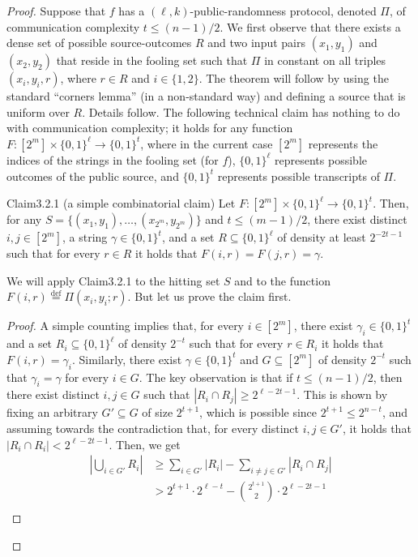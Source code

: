 \begin{proof}
Suppose that $f$ has a $(\ell,k)$-public-randomness protocol, denoted $\Pi$, of communication complexity $t\le(n-1)/2$. We first observe that there exists a dense set of possible source-outcomes $R$ and two input pairs $(x_1,y_1)$ and $(x_2,y_2)$ that reside in the fooling set such that $\Pi$ in constant on all triples $(x_i,y_i,r)$, where $r\in R$ and $i\in\{1,2\}$. The theorem will follow by using the standard ``corners lemma'' (in a non-standard way) and defining a source that is uniform over $R$. Details follow.
The following technical claim has nothing to do with communication complexity; it holds for any function $F:[2^m]\times\{0,1\}^\ell\to\{0,1\}^t$, where in the current case $[2^m]$ represents the indices of the strings in the fooling set (for $f$), $\{0,1\}^\ell$ represents possible outcomes of the public source, and $\{0,1\}^t$ represents possible transcripts of $\Pi$.
\begin{authorclaim}{Claim3.2.1 (a simple combinatorial claim)}
Let $F:[2^m]\times\{0,1\}^\ell\to\{0,1\}^t$. Then, for any $S=\{(x_1,y_1),\ldots,(x_{2^m},y_{2^m})\}$ and $t\le(m-1)/2$, there exist distinct $i,j\in[2^m]$, a string $\gamma\in\{0,1\}^t$, and a set $R\subseteq\{0,1\}^\ell$ of density at least $2^{-2t-1}$ such that for every $r\in R$ it holds that $F(i,r)=F(j,r)=\gamma$.
\end{authorclaim}
We will apply Claim3.2.1 to the hitting set $S$ and to the function $F(i,r)\stackrel{\mathrm{def}}=\Pi(x_i,y_i;r)$. But let us prove the claim first.
\begin{proof}
A simple counting implies that, for every $i\in[2^m]$, there exist $\gamma_i\in\{0,1\}^t$ and a set $R_i\subseteq\{0,1\}^\ell$ of density $2^{-t}$ such that for every $r\in R_i$ it holds that $F(i,r)=\gamma_i$. Similarly, there exist $\gamma\in\{0,1\}^t$ and $G\subseteq[2^m]$ of density $2^{-t}$ such that $\gamma_i=\gamma$ for every $i\in G$.
The key observation is that if $t\le(n-1)/2$, then there exist distinct $i,j\in G$ such that $|R_i\cap R_j|\ge2^{\ell-2t-1}$. This is shown by fixing an arbitrary $G'\subseteq G$ of size $2^{t+1}$, which is possible since $2^{t+1}\le2^{n-t}$, and assuming towards the contradiction that, for every distinct $i,j\in G'$, it holds that $|R_i\cap R_i|<2^{\ell-2t-1}$. Then, we get
\begin{align*}
\left|\bigcup_{i\in G'}R_i\right|&\ge\sum_{i\in G'}|R_i|-\sum_{i\ne j\in G'}|R_i\cap R_j|\\
&>2^{t+1}\cdot2^{\ell-t}-\binom{2^{t+1}}2\cdot2^{\ell-2t-1}\\

\end{align*}
\end{proof}
\end{proof}
